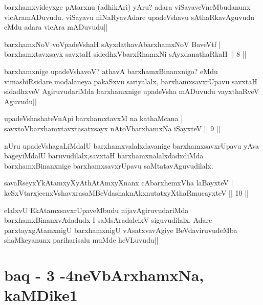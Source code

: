\begin{artha}
barxhamxvideyxge pAtarxnu (adhikAri) yAru? adara viSayaveVneMbudanunx vicAramADuvudu. viSayavu niNaRyavAdare upadeVshavu sAthaRkavAguvudu eMdu adara vicAra mADuvudu||
\end{artha}


\begin{shl}
barxhamxNoV voVpadeVshaH sAyxdathavA\s barxhamxNoV BaveVtf |\\
barxhamxtavxsayx savxtaH sidedhxVbarxRhamxNi sAyxdanathaRkaH \hfill || 8 ||
\end{shl}

\begin{artha}
barxhamxnige upadeVshavoV? athavA barxhamxBinanxnigo? eMdu vimashiRsidare modalaneya pakaSxvu sariyalalx, barxhamxsavxrUpavu savxtaH sidadhxveV AgiruvudariMda barxhamxnige upadeVsha mADuvudu vayxthaRveV Aguvudu||
\end{artha}


\begin{shl}
upadeVshashateVnApi barxhamxtavxM na kathaMcana |\\
savxtoV\s barxhamxtavxtasatxsayx nAtoV\s barxhamxNa iSayxteV \hfill || 9 ||
\end{shl}

\begin{artha}
nUru upadeVshagaLiMdalU barxhamxvalalxdavanige barxhamxsavxrUpavu yAva bageyiMdalU baruvudilalx,savxtaH barxhamxnalalxdadxdiMda barxhamxBinanxnige barxhamxsavxrUpavu saMtatavAguvudilalx.
\end{artha}

\begin{shl}
savaRseyxYkAtamxyXyAthAtAmxyXnanx cAbarxhemxVha laBayxteV |\\
keSxVtarxjecnxVshavxrasaMBeVdashaknAkxnutatxyXthaRmucayxteV \hfill || 10 ||
\end{shl}

\begin{artha}
elalxvU EkAtamxsavxrUpaveMbudu nijavAgiruvudariMda barxhamxBinanxvAdadudx I saMsAradalelxV siguvudilalx. Adare parxtayxgAtamxnigU barxhamxnigU vAsatxvavAgiye BeVdaviruvudeMba shaMkeyanunx pariharisalu muMde heVLuvudu||
\end{artha}

\section*{baq - 3 -4neVbArxhamxNa, kaMDike1}

